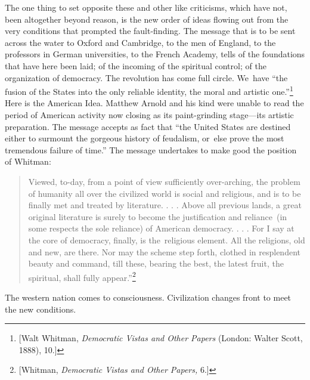 \documentclass[twoside,symmetric,nobib,justified]{tufte-book}
\begin{document}
The one thing to set opposite these and other like criticisms, which
have not, been altogether beyond reason, is the new order of ideas
flowing out from the very conditions that prompted the fault-finding.
The message that is to be sent across the water to Oxford and Cambridge,
to the men of England, to the professors in German universities, to the
French Academy, tells of the foundations that have here been laid; of
the incoming of the spiritual control; of the organization of democracy.
The revolution has come full circle. We~have ``the fusion of the States
into the only reliable identity, the moral and artistic
one.''\footnote{{[}Walt Whitman, \emph{Democratic Vistas and Other
  Papers} (London: Walter Scott, 1888), 10.{]}} Here is the American
Idea. Matthew Arnold and his kind were unable to read the period of
American activity now closing as its paint-grinding stage---its artistic
preparation. The message accepts as fact that ``the United States are
destined either to surmount the gorgeous history of feudalism, or~else
prove the most tremendous failure of time.'' The message undertakes to
make good the position of Whitman:

\begin{quote}
Viewed, to-day, from a point of view sufficiently over-arching, the
problem of humanity all over the civilized world is social and
religious, and is to be finally met and treated by literature. . . .
Above all previous lands, a great original literature is surely to
become the justification and reliance~(in some respects the sole
reliance) of American democracy. . . . For I say at the core of
democracy, finally, is the~religious element. All the religions, old and
new, are there. Nor may the scheme step forth, clothed in resplendent
beauty and command, till these, bearing the best, the latest fruit, the
spiritual, shall fully appear.''\footnote{{[}Whitman, \emph{Democratic
  Vistas and Other Papers,} 6.{]}}
\end{quote}

The western nation comes to consciousness. Civilization changes front to
meet the new conditions.~
\end{document}
